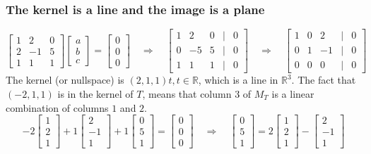 \documentclass[a4paper, 9pt]{extarticle}
\begin{document}
\subsubsection*{The kernel is a line and the image is a plane}
$$
  \begin{bmatrix}
    1 & 2  & 0 \\
    2 & -1 & 5 \\
    1 & 1  & 1
  \end{bmatrix}
  \begin{bmatrix}
    a \\
    b \\
    c
  \end{bmatrix}
  =
  \begin{bmatrix}
    0 \\
    0 \\
    0
  \end{bmatrix}
  \quad \Rightarrow \quad
  \begin{bmatrix}
    1 & 2  & 0 & | & 0 \\
    0 & -5 & 5 & | & 0 \\
    1 & 1  & 1 & | & 0
  \end{bmatrix}
  \quad \Rightarrow \quad
  \begin{bmatrix}
    1 & 0 & 2  & | & 0 \\
    0 & 1 & -1 & | & 0 \\
    0 & 0 & 0  & | & 0
  \end{bmatrix}
$$
The kernel (or nullspace) is $(2, 1, 1)t, t \in \mathbb{R}$, which is a line in $\mathbb{R}^3$. The fact that $(-2, 1, 1)$ is in the kernel of $T$, means that column 3 of $M_T$ is a linear combination of columns $1$ and $2$.
$$
  -2
  \begin{bmatrix}
    1 \\
    2 \\
    1
  \end{bmatrix}
  +
  1
  \begin{bmatrix}
    2  \\
    -1 \\
    1
  \end{bmatrix}
  +
  1
  \begin{bmatrix}
    0 \\
    5 \\
    1
  \end{bmatrix}
  =
  \begin{bmatrix}
    0 \\
    0 \\
    0
  \end{bmatrix}
  \quad \Longrightarrow \quad
  \begin{bmatrix}
    0 \\
    5 \\
    1
  \end{bmatrix}
  =
  2
  \begin{bmatrix}
    1 \\
    2 \\
    1
  \end{bmatrix}
  -
  \begin{bmatrix}
    2  \\
    -1 \\
    1
  \end{bmatrix}
$$
\end{document}
